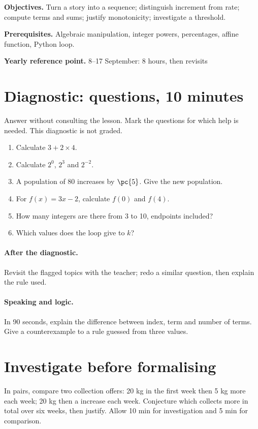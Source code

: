 \label{C01}
\begin{keypoint}
\textbf{Objectives.} Turn a story into a sequence; distinguish increment from rate; compute terms and sums; justify monotonicity; investigate a threshold.

\textbf{Prerequisites.} Algebraic manipulation, integer powers, percentages, affine function, Python loop.

\textbf{Yearly reference point.} 8--17 September: 8 hours, then revisits\end{keypoint}
\section*{Diagnostic:  questions, 10 minutes}\label{C01-D}
Answer without consulting the lesson. Mark the questions for which help is needed. This diagnostic is not graded.
\begin{enumerate}
\item Calculate $3+2\times4$.
\item Calculate $2^0$, $2^3$ and $2^{-2}$.
\item A population of 80 increases by $\pc{5}$. Give the new population.
\item For $f(x)=3x-2$, calculate $f(0)$ and $f(4)$.
\item How many integers are there from 3 to 10, endpoints included?
\item Which values does the loop  give to $k$?
\end{enumerate}
\paragraph{After the diagnostic.} Revisit the flagged topics with the teacher; redo a similar question, then explain the rule used.
\paragraph{Speaking and logic.} In 90 seconds, explain the difference between index, term and number of terms. Give a counterexample to a rule guessed from three values.
\mxnewpage
\section*{Investigate before formalising}\label{C01-RECH}
In pairs, compare two collection offers: 20 kg in the first week then 5 kg more each week; 20 kg then a  increase each week. Conjecture which collects more in total over six weeks, then justify. Allow 10 min for investigation and 5 min for comparison.
